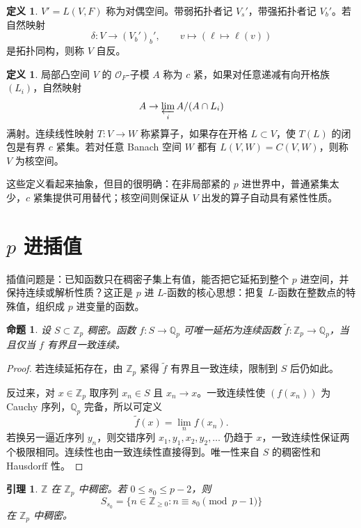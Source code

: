 \documentclass[11pt,a4paper,openany]{ctexbook}
\numberwithin{equation}{chapter}
\newcommand{\Q}{\mathbb{Q}}
\newcommand{\Z}{\mathbb{Z}}
\theoremstyle{plain}
\newtheorem{proposition}[theorem]{命题}
\newtheorem{lemma}[theorem]{引理}
\theoremstyle{definition}
\newtheorem{definition}[theorem]{定义}
\theoremstyle{remark}
\begin{document}
\begin{definition}
$V' = L(V,F)$ 称为对偶空间。带弱拓扑者记 $V_s'$，带强拓扑者记 $V_b'$。若自然映射
\[
  \delta:V\to (V_b')_b',\qquad v\mapsto(\ell\mapsto \ell(v))
\]
是拓扑同构，则称 $V$ 自反。
\end{definition}

\begin{definition}
局部凸空间 $V$ 的 $\mathcal O_F$-子模 $A$ 称为 $c$ 紧，如果对任意递减有向开格族 $(L_i)$，自然映射
\[
  A\to\varprojlim_i A/(A\cap L_i)
\]
满射。连续线性映射 $T:V\to W$ 称紧算子，如果存在开格 $L\subset V$，使 $T(L)$ 的闭包是有界 $c$ 紧集。若对任意 Banach 空间 $W$ 都有 $L(V,W)=C(V,W)$，则称 $V$ 为核空间。
\end{definition}

这些定义看起来抽象，但目的很明确：在非局部紧的 $p$ 进世界中，普通紧集太少，$c$ 紧集提供可用替代；核空间则保证从 $V$ 出发的算子自动具有紧性性质。

\section{\texorpdfstring{$p$ 进插值}{p 进插值}}

插值问题是：已知函数只在稠密子集上有值，能否把它延拓到整个 $p$ 进空间，并保持连续或解析性质？这正是 $p$ 进 $L$-函数的核心思想：把复 $L$-函数在整数点的特殊值，组织成 $p$ 进变量的函数。

\begin{proposition}
设 $S\subset\Z_p$ 稠密。函数 $f:S\to\Q_p$ 可唯一延拓为连续函数 $\widetilde f:\Z_p\to\Q_p$，当且仅当 $f$ 有界且一致连续。
\end{proposition}

\begin{proof}
若连续延拓存在，由 $\Z_p$ 紧得 $\widetilde f$ 有界且一致连续，限制到 $S$ 后仍如此。

反过来，对 $x\in\Z_p$ 取序列 $x_n\in S$ 且 $x_n\to x$。一致连续性使 $(f(x_n))$ 为 Cauchy 序列，$\Q_p$ 完备，所以可定义
\[
  \widetilde f(x)=\lim_n f(x_n).
\]
若换另一逼近序列 $y_n$，则交错序列 $x_1,y_1,x_2,y_2,\ldots$ 仍趋于 $x$，一致连续性保证两个极限相同。连续性也由一致连续性直接得到。唯一性来自 $S$ 的稠密性和 Hausdorff 性。
\end{proof}

\begin{lemma}
$\Z$ 在 $\Z_p$ 中稠密。若 $0\le s_0\le p-2$，则
\[
  S_{s_0}=\{n\in\Z_{\ge0}:n\equiv s_0\pmod {p-1}\}
\]
在 $\Z_p$ 中稠密。
\end{lemma}
\end{document}
